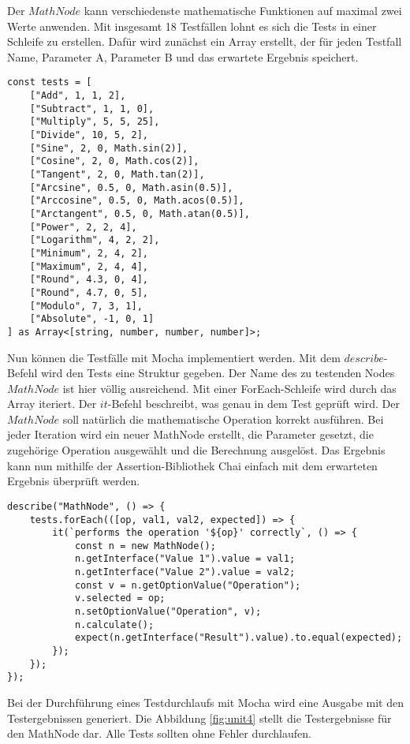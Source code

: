 Der $MathNode$ kann verschiedenste mathematische Funktionen auf maximal zwei Werte anwenden. Mit insgesamt 18 Testfällen lohnt es sich die Tests in einer Schleife zu erstellen. Dafür wird zunächst ein Array erstellt, der für jeden Testfall Name, Parameter A, Parameter B und das erwartete Ergebnis speichert.

\begin{lstlisting}[caption=Unit-Test: Testdefinition,label=unit2]
const tests = [
    ["Add", 1, 1, 2],
    ["Subtract", 1, 1, 0],
    ["Multiply", 5, 5, 25],
    ["Divide", 10, 5, 2],
    ["Sine", 2, 0, Math.sin(2)],
    ["Cosine", 2, 0, Math.cos(2)],
    ["Tangent", 2, 0, Math.tan(2)],
    ["Arcsine", 0.5, 0, Math.asin(0.5)],
    ["Arccosine", 0.5, 0, Math.acos(0.5)],
    ["Arctangent", 0.5, 0, Math.atan(0.5)],
    ["Power", 2, 2, 4],
    ["Logarithm", 4, 2, 2],
    ["Minimum", 2, 4, 2],
    ["Maximum", 2, 4, 4],
    ["Round", 4.3, 0, 4],
    ["Round", 4.7, 0, 5],
    ["Modulo", 7, 3, 1],
    ["Absolute", -1, 0, 1]
] as Array<[string, number, number, number]>;
\end{lstlisting}

Nun können die Testfälle mit Mocha implementiert werden. Mit dem  $describe$-Befehl wird den Tests eine Struktur gegeben. Der Name des zu testenden Nodes $MathNode$ ist hier völlig ausreichend. Mit einer ForEach-Schleife wird durch das Array iteriert. Der $it$-Befehl beschreibt, was genau in dem Test geprüft wird. Der $MathNode$ soll natürlich die mathematische Operation korrekt ausführen. Bei jeder Iteration wird ein neuer MathNode erstellt, die Parameter gesetzt, die zugehörige Operation ausgewählt und die Berechnung ausgelöst. Das Ergebnis kann nun mithilfe der Assertion-Bibliothek Chai einfach mit dem erwarteten Ergebnis überprüft werden. 

\begin{lstlisting}[caption=Unit-Test: Testdurchführung,label=unit3]
describe("MathNode", () => {
    tests.forEach(([op, val1, val2, expected]) => {
        it(`performs the operation '${op}' correctly`, () => {
            const n = new MathNode();
            n.getInterface("Value 1").value = val1;
            n.getInterface("Value 2").value = val2;
            const v = n.getOptionValue("Operation");
            v.selected = op;
            n.setOptionValue("Operation", v);
            n.calculate();
            expect(n.getInterface("Result").value).to.equal(expected);
        });
    });
});
\end{lstlisting}

Bei der Durchführung eines Testdurchlaufs mit Mocha wird eine Ausgabe mit den Testergebnissen generiert. Die Abbildung \ref{fig:unit4} stellt die Testergebnisse für den MathNode dar. Alle Tests sollten ohne Fehler durchlaufen.

